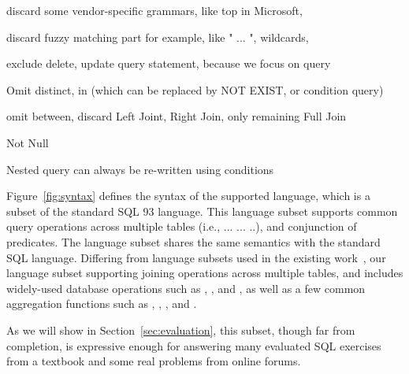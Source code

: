 discard some vendor-specific grammars, like top in Microsoft,

discard fuzzy matching part for example, like " ... ", wildcards,

exclude delete, update query statement, because we focus on query

Omit distinct, in (which can be replaced by NOT EXIST, or condition query)

omit between, discard Left Joint, Right Join, only remaining Full Join

Not Null

Nested query can always be re-written using conditions


Figure~\ref{fig:syntax} defines the syntax of the supported language,
which
is a subset of the standard SQL 93 language. This language subset
supports common query operations across multiple tables (i.e.,
 ...  ... ..), and 
conjunction of predicates. The language
subset shares the same semantics with the standard SQL language.
Differing from language subsets used in the
existing work~\cite{DasSarma:2010}, our language subset
supporting
joining operations across multiple tables, and includes
widely-used database operations such as ,
, and , as
well as a few common aggregation functions such as , ,
, and .

As we will show in Section~\ref{sec:evaluation}, this
subset, though far from completion, is expressive enough for answering
many evaluated SQL exercises from a textbook and some real problems
from online forums.

